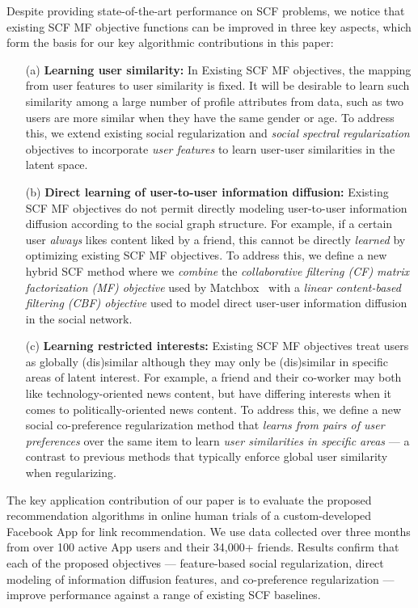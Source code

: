 Despite providing state-of-the-art performance on SCF problems, we
notice that existing SCF MF objective functions can be improved in
three key aspects, which form the basis for our key algorithmic
contributions in this paper:
\begin{enumerate}
\item[(a)] {\bf Learning user similarity:}
In Existing SCF MF objectives, the mapping from user features to user
similarity is fixed.  It will be desirable to learn such similarity
among a large number of profile attributes from data, such as two
users are more similar when they have the same gender or age.
To address this, we extend existing social regularization and
\emph{social spectral regularization} objectives to incorporate
\emph{user features} to learn user-user similarities in the latent
space.
\item[(b)] {\bf Direct learning of user-to-user information diffusion:}
Existing SCF MF objectives do not permit directly modeling
user-to-user information diffusion according to the social graph
structure.  For example, if a certain user \emph{always} likes content
liked by a friend, this cannot be directly \emph{learned} by
optimizing existing SCF MF objectives.
To address this, we define a new hybrid SCF method where we
\emph{combine} the \emph{collaborative filtering (CF) matrix
factorization (MF) objective} used by Matchbox~\cite{matchbox} with a
\emph{linear content-based filtering (CBF) objective} used to model
direct user-user information diffusion in the social network.
\item[(c)] {\bf Learning restricted interests:} 
Existing SCF MF objectives treat users as globally (dis)similar
although they may only be (dis)similar in specific areas of latent interest.
For example, a friend and their co-worker may both like
technology-oriented news content, but have differing interests when it
comes to politically-oriented news content.
To address this, we define a new social co-preference regularization
method that \emph{learns from pairs of user preferences} over the same
item to learn \emph{user similarities in specific areas} --- a
contrast to previous methods that typically enforce global user
similarity when regularizing.
\end{enumerate}

The key application contribution of our paper is to evaluate the
proposed recommendation algorithms in online human trials of a
custom-developed Facebook App for link recommendation.  We use data
collected over three months from over 100 active App users and their
34,000+ friends.  Results confirm that each of the proposed objectives
--- feature-based social regularization, direct modeling of
information diffusion features, and co-preference regularization ---
improve performance against a range of existing SCF baselines.  

